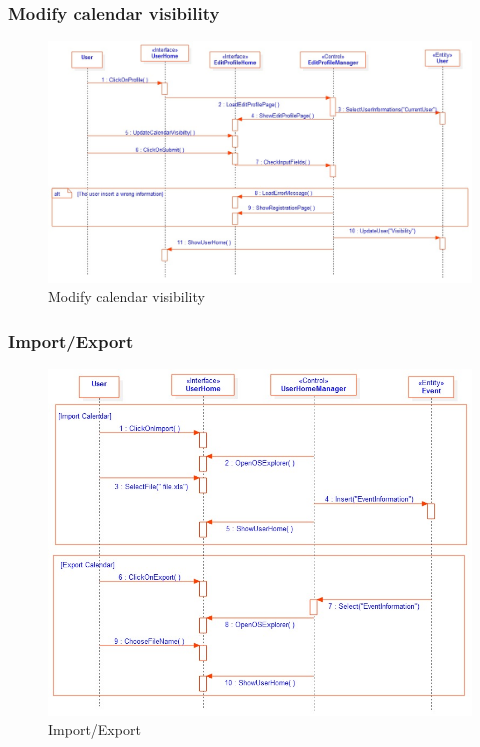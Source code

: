 \subsubsection{Modify calendar visibility}
\begin{figure}[tbh]
  \begin{center}
  \includegraphics[width=150mm]{10modifyvisibity}
    \caption{Modify calendar visibility}\label{Fig 1:}
  \end{center}
\end{figure}
\newpage
\subsubsection{Import/Export}
\begin{figure}[tbh]
  \begin{center}
  \includegraphics[width=150mm]{11import}
    \caption{Import/Export}\label{Fig 1:}
  \end{center}
\end{figure}
\newpage

